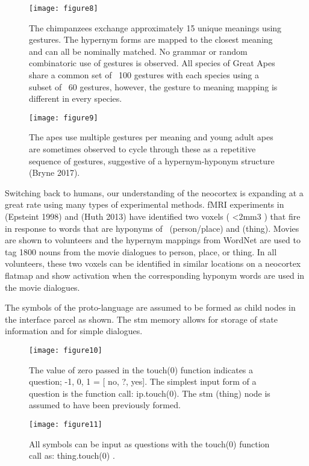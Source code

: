 \documentclass{clv3}
\begin{document}
 \begin{figure}
\texttt{[image: figure8]}
\caption{The chimpanzees exchange approximately 15 unique meanings using gestures.  The hypernym forms are mapped to the closest meaning and can all be nominally matched.               
No grammar or random combinatoric use of gestures is observed.  All species of Great Apes share a common set of ~100 gestures with each species using a subset of ~60 gestures, however, the gesture to meaning mapping is different in every species.}
\end{figure}






 \begin{figure}
\texttt{[image: figure9]}
\caption{The apes use multiple gestures  per meaning and young adult apes are sometimes observed to cycle through these as a repetitive sequence of gestures, suggestive of a hypernym-hyponym structure (Bryne 2017).}
\end{figure}


Switching back to humans, our understanding of the neocortex is expanding at a great rate using many types of experimental methods.  fMRI experiments in (Epsteint 1998) and (Huth 2013) have identified two voxels ( <2mm3 ) that fire in response to words that are hyponyms of ~(person/place) and (thing).    Movies are shown to volunteers and the hypernym mappings from WordNet are used to tag 1800 nouns from the movie dialogues to person, place, or thing.  In all volunteers, these two voxels can be identified in similar locations on a neocortex flatmap and  show activation when the corresponding hyponym words are used in the movie dialogues.


The symbols of the proto-language are assumed to be formed as child nodes in the interface parcel as shown.    The stm memory allows for storage of state information and for simple dialogues.

 \begin{figure}
\texttt{[image: figure10]}
\caption{The value of zero passed in the touch(0) function  indicates a question; -1, 0, 1  =    [ no, ?, yes].  The simplest input form of a question is the function call:  ip.touch(0).  The stm (thing) node is assumed to have been previously formed. }
\end{figure}

 \begin{figure}
\texttt{[image: figure11]}
\caption{All symbols can be input as questions with the touch(0) function call as: thing.touch(0) .}
\end{figure}
\end{document}
